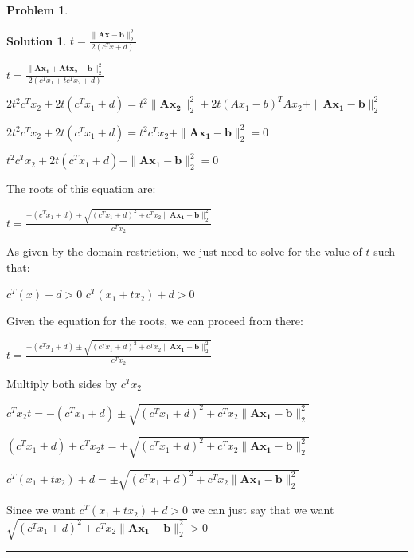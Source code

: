 \documentclass{article}
\theoremstyle{definition}
\newtheorem{problem}{Problem}
\def\fline{\rule{0.75\linewidth}{0.5pt}}
\newcommand{\finishline}{\begin{center}\fline\end{center}}
\newtheorem*{solution*}{Solution}
\newenvironment{solution}{\begin{solution*}}{{\finishline} \end{solution*}}
\begin{document}
\begin{problem}
\begin{enumerate}
\begin{solution}
         $t = \frac{\|\mathbf{Ax - b}\|^2_2 }{2(c^Tx + d)}$ \newline 

         $t = \frac{\|\mathbf{Ax_1 + Atx_2 - b}\|^2_2 }{2(c^Tx_1 + tc^Tx_2 + d)}$ \newline 


         $2t^2 c^Tx_2 + 2t(c^Tx_1 + d) = t^2 \|\mathbf{Ax_2}\|^2_2 + 2t(Ax_1 - b)^T Ax_2 +  \|\mathbf{Ax_1 - b}\|^2_2 $ \newline 

         $2t^2 c^Tx_2 + 2t(c^Tx_1 + d) = t^2 c^T x_2 +  \|\mathbf{Ax_1 - b}\|^2_2  = 0$ \newline 

         $t^2 c^Tx_2 + 2t(c^Tx_1 + d) - \|\mathbf{Ax_1 - b}\|^2_2  = 0 $ \newline 

         The roots of this equation are: \newline 

         $t = \frac{-(c^Tx_1 + d) \pm \sqrt{(c^Tx_1 + d)^2 + c^Tx_2 \|\mathbf{Ax_1 - b}\|^2_2}}{c^Tx_2}$

        As given by the domain restriction, we just need to solve for the value of $t$ such that: \newline 

        $c^T(x) + d > 0$ \newline 
        $c^T(x_1 + tx_2) + d > 0$ \newline 

        Given the equation for the roots, we can proceed from there: \newline 

        $t = \frac{-(c^Tx_1 + d) \pm \sqrt{(c^Tx_1 + d)^2 + c^Tx_2 \|\mathbf{Ax_1 - b}\|^2_2}}{c^Tx_2}$ \newline 

        Multiply both sides by $c^Tx_2$ \newline 

        $c^Tx_2 t = -(c^Tx_1 + d) \pm \sqrt{(c^Tx_1 + d)^2 + c^Tx_2 \|\mathbf{Ax_1 - b}\|^2_2}$ \newline 

        $(c^Tx_1 + d) + c^Tx_2 t = \pm \sqrt{(c^Tx_1 + d)^2 + c^Tx_2 \|\mathbf{Ax_1 - b}\|^2_2}$ \newline 

        $c^T(x_1 + tx_2) + d = \pm \sqrt{(c^Tx_1 + d)^2 + c^Tx_2 \|\mathbf{Ax_1 - b}\|^2_2}$
        

        Since we want $c^T(x_1 + tx_2) + d > 0$ \newline 
        we can just say that we want  
        $\sqrt{(c^Tx_1 + d)^2 + c^Tx_2 \|\mathbf{Ax_1 - b}\|^2_2} > 0$

         
        
        
    \end{solution}
\end{enumerate}
\end{problem}
\end{document}
